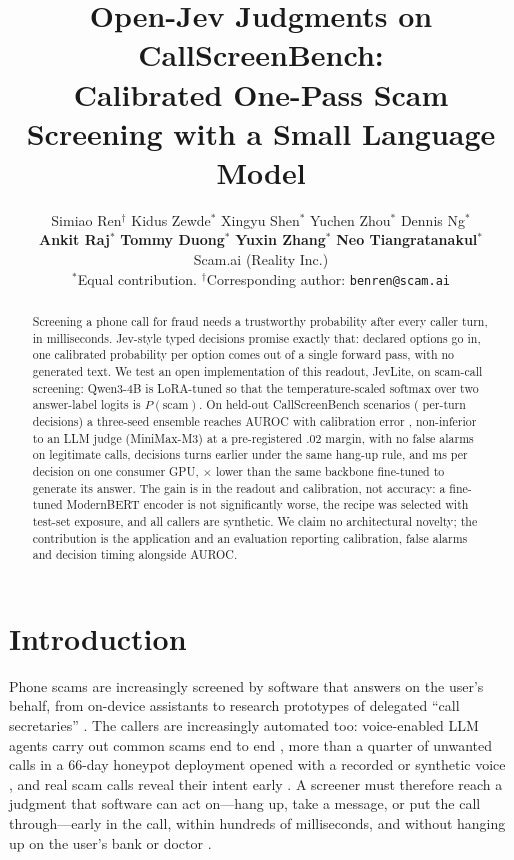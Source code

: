 \documentclass[11pt]{article}
\title{Open-Jev Judgments on CallScreenBench:\\
Calibrated One-Pass Scam Screening with a Small Language Model}
\author{Simiao Ren$^{\dagger}$ \quad Kidus Zewde$^{*}$ \quad Xingyu Shen$^{*}$ \quad Yuchen Zhou$^{*}$ \quad Dennis Ng$^{*}$ \\
\textbf{Ankit Raj}$^{*}$ \quad \textbf{Tommy Duong}$^{*}$ \quad \textbf{Yuxin Zhang}$^{*}$ \quad \textbf{Neo Tiangratanakul}$^{*}$ \\
Scam.ai (Reality Inc.) \\
$^{*}$Equal contribution. \quad $^{\dagger}$Corresponding author: \texttt{benren@scam.ai}}
\begin{document}
\maketitle

\begin{abstract}
Screening a phone call for fraud needs a trustworthy probability after every caller turn, in milliseconds. Jev-style typed decisions promise exactly that: declared options go in, one calibrated probability per option comes out of a single forward pass, with no generated text. We test an open implementation of this readout, JevLite, on scam-call screening: Qwen3-4B is LoRA-tuned so that the temperature-scaled softmax over two answer-label logits is $P(\text{scam})$. On \ntestscen{} held-out CallScreenBench scenarios (\ntest{} per-turn decisions) a three-seed ensemble reaches AUROC \jlauroc{} with calibration error \jlece{}, non-inferior to an LLM judge (MiniMax-M3) at a pre-registered .02 margin, with no false alarms on legitimate calls, decisions \dturn{} turns earlier under the same hang-up rule, and \latpfifty{} ms per decision on one consumer GPU, \armAlatratio$\times$ lower than the same backbone fine-tuned to generate its answer. The gain is in the readout and calibration, not accuracy: a fine-tuned ModernBERT encoder is not significantly worse, the recipe was selected with test-set exposure, and all callers are synthetic. We claim no architectural novelty; the contribution is the application and an evaluation reporting calibration, false alarms and decision timing alongside AUROC.
\end{abstract}

\section{Introduction}

Phone scams are increasingly screened by software that answers on the user's behalf, from on-device assistants to research prototypes of delegated ``call secretaries'' \citep{pandit2023robocall,callscreenbench2026}. The callers are increasingly automated too: voice-enabled LLM agents carry out common scams end to end \citep{fang2024voiceagents}, more than a quarter of unwanted calls in a 66-day honeypot deployment opened with a recorded or synthetic voice \citep{own_machines2026}, and real scam calls reveal their intent early \citep{anatomy2026}. A screener must therefore reach a judgment that software can act on---hang up, take a message, or put the call through---early in the call, within hundreds of milliseconds, and without hanging up on the user's bank or doctor \citep{callscreenbench2026}.
\end{document}
